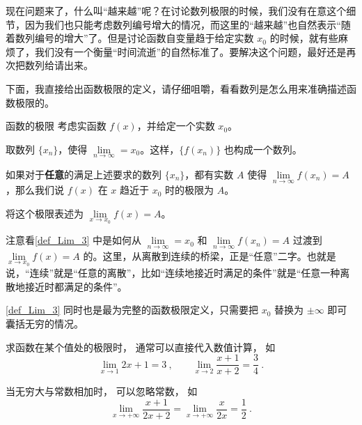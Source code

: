 现在问题来了，什么叫“越来越”呢？在讨论数列极限的时候，我们没有在意这个细节，因为我们也只能考虑数列编号增大的情况，而这里的“越来越”也自然表示“随着数列编号的增大”了。但是讨论函数自变量趋于给定实数 $x_0$ 的时候，就有些麻烦了，我们没有一个衡量“时间流逝”的自然标准了。要解决这个问题，最好还是再次把数列给请出来。

下面，我直接给出函数极限的定义，请仔细咀嚼，看看数列是怎么用来准确描述函数极限的。

\begin{definition}{函数的极限}\label{def_Lim_3}
考虑实函数 $f(x)$，并给定一个实数 $x_0$。

取数列 $\{x_n\}$，使得 $\lim\limits_{n\to\infty}=x_0$。这样，$\{f(x_n)\}$ 也构成一个数列。

如果对于\textbf{任意}的满足上述要求的数列 $\{x_n\}$，都有实数 $A$ 使得 $\lim\limits_{n\to\infty}f(x_n)=A$，那么我们说 $f(x)$ 在 $x$ 趋近于 $x_0$ 时的极限为 $A$。

将这个极限表述为 $\lim\limits_{x\to x_0}f(x)=A$。
\end{definition}

注意看\autoref{def_Lim_3} 中是如何从 $\lim\limits_{n\to\infty}=x_0$ 和 $\lim\limits_{n\to\infty}f(x_n)=A$ 过渡到 $\lim\limits_{x\to x_0}f(x)=A$ 的。这里，从离散到连续的桥梁，正是“任意”二字。也就是说，“连续”就是“任意的离散”，比如“连续地接近时满足的条件”就是“任意一种离散地接近时都满足的条件”。

\autoref{def_Lim_3} 同时也是最为完整的函数极限定义，只需要把 $x_0$ 替换为 $\pm\infty$ 即可囊括无穷的情况。



\begin{example}{}
求函数在某个值处的极限时， 通常可以直接代入数值计算， 如
\begin{equation}
\lim_{x\to 1} 2x + 1 = 3 ~,\qquad \lim_{x\to 2}\frac{x + 1}{x + 2} = \frac34~.
\end{equation}

当无穷大与常数相加时， 可以忽略常数， 如
\begin{equation}
\lim_{x\to +\infty} \frac{x + 1}{2x + 2} = \lim_{x\to +\infty} \frac{x}{2x} = \frac12~.
\end{equation}
\end{example}

